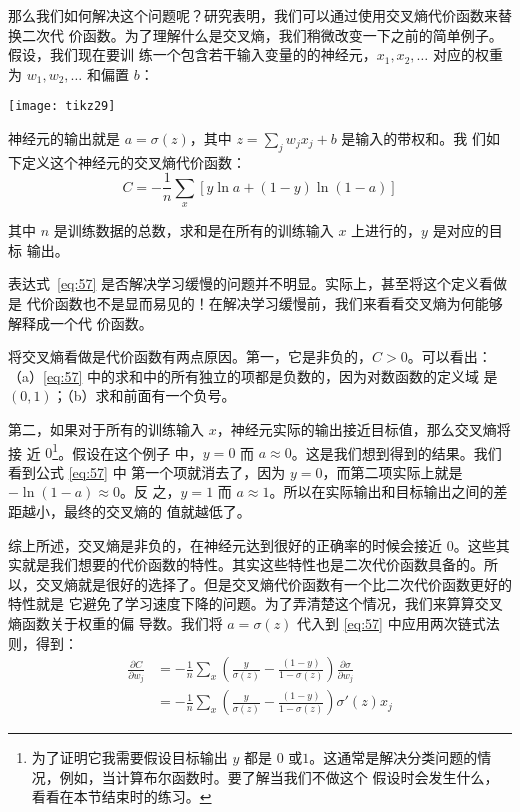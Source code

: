 那么我们如何解决这个问题呢？研究表明，我们可以通过使用交叉熵代价函数来替换二次代
价函数。为了理解什么是交叉熵，我们稍微改变一下之前的简单例子。假设，我们现在要训
练一个包含若干输入变量的的神经元，$x_1, x_2, \ldots$ 对应的权重为 $w_1, w_2,
\ldots$ 和偏置 $b$：

\begin{center}
  \texttt{[image: tikz29]}
\end{center}

神经元的输出就是 $a = \sigma(z)$，其中 $z = \sum_j w_j x_j+b$ 是输入的带权和。我
们如下定义这个神经元的交叉熵代价函数：
\begin{equation}
  C = -\frac{1}{n} \sum_x \left[y \ln a + (1-y ) \ln (1-a) \right]
\label{eq:57}\tag{57}
\end{equation}

其中 $n$ 是训练数据的总数，求和是在所有的训练输入 $x$ 上进行的，$y$ 是对应的目标
输出。

表达式~\eqref{eq:57} 是否解决学习缓慢的问题并不明显。实际上，甚至将这个定义看做是
代价函数也不是显而易见的！在解决学习缓慢前，我们来看看交叉熵为何能够解释成一个代
价函数。

将交叉熵看做是代价函数有两点原因。第一，它是非负的，$C > 0$。可以看出：
（a）\eqref{eq:57} 中的求和中的所有独立的项都是负数的，因为对数函数的定义域
是 $(0,1)$；（b）求和前面有一个负号。

第二，如果对于所有的训练输入 $x$，神经元实际的输出接近目标值，那么交叉熵将接
近 $0$\footnote{为了证明它我需要假设目标输出 $y$ 都是 $0$
  或$1$。这通常是解决分类问题的情况，例如，当计算布尔函数时。要了解当我们不做这个
  假设时会发生什么，看看在本节结束时的练习。}。假设在这个例子
中，$y=0$ 而 $a\approx 0$。这是我们想到得到的结果。我们看到公式 \eqref{eq:57} 中
第一个项就消去了，因为 $y=0$，而第二项实际上就是 $-\ln (1-a)\approx 0$。反
之，$y=1$ 而 $a\approx 1$。所以在实际输出和目标输出之间的差距越小，最终的交叉熵的
值就越低了。

综上所述，交叉熵是非负的，在神经元达到很好的正确率的时候会接近
$0$。这些其实就是我们想要的代价函数的特性。其实这些特性也是二次代价函数具备的。所
以，交叉熵就是很好的选择了。但是交叉熵代价函数有一个比二次代价函数更好的特性就是
它避免了学习速度下降的问题。为了弄清楚这个情况，我们来算算交叉熵函数关于权重的偏
导数。我们将 $a=\sigma(z)$ 代入到 \eqref{eq:57} 中应用两次链式法则，得到：
\begin{align}
  \frac{\partial C}{\partial w_j} &= -\frac{1}{n} \sum_x \left(
  \frac{y }{\sigma(z)} -\frac{(1-y)}{1-\sigma(z)} \right)
  \frac{\partial \sigma}{\partial w_j} \label{eq:58}\tag{58}\\
  &= -\frac{1}{n} \sum_x \left(
  \frac{y}{\sigma(z)}
  -\frac{(1-y)}{1-\sigma(z)} \right)\sigma'(z) x_j \label{eq:59}\tag{59}
\end{align}

